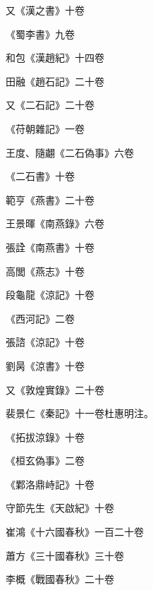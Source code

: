 \begin{pinyinscope}
 又《漢之書》十卷



 《蜀李書》九卷



 和包《漢趙紀》十四卷



 田融《趙石記》二十卷



 又《二石記》二十卷



 《苻朝雜記》一卷



 王度、隨翽《二石偽事》六卷



 《二石書》十卷



 範亨《燕書》二十卷



 王景暉《南燕錄》六卷



 張詮《南燕書》十卷



 高閭《燕志》十卷



 段龜龍《涼記》十卷



 《西河記》二卷



 張諮《涼記》十卷



 劉昺《涼書》十卷



 又《敦煌實錄》二十卷



 裴景仁《秦記》十一卷杜惠明注。



 《拓拔涼錄》十卷



 《桓玄偽事》二卷



 《鄴洛鼎峙記》十卷



 守節先生《天啟紀》十卷



 崔鴻《十六國春秋》一百二十卷



 蕭方《三十國春秋》三十卷



 李概《戰國春秋》二十卷




\end{pinyinscope}
